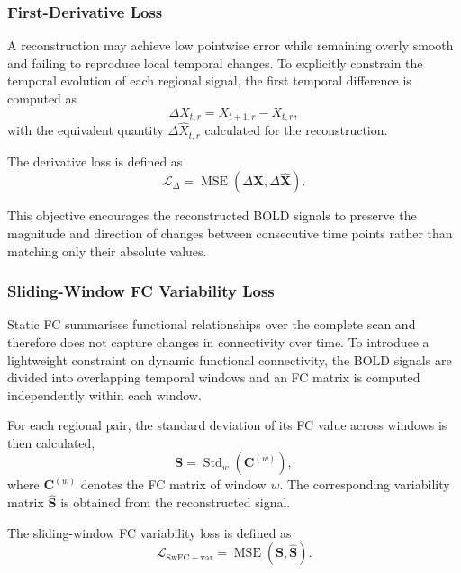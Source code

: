 \subsubsection{First-Derivative Loss}

A reconstruction may achieve low pointwise error while remaining overly
smooth and failing to reproduce local temporal changes. To explicitly
constrain the temporal evolution of each regional signal, the first
temporal difference is computed as
\begin{equation}
    \Delta X_{t,r}
    =
    X_{t+1,r}-X_{t,r},
\end{equation}
with the equivalent quantity $\Delta\hat{X}_{t,r}$ calculated for the
reconstruction.

The derivative loss is defined as
\begin{equation}
    \mathcal{L}_{\Delta}
    =
    \operatorname{MSE}
    \left(
        \Delta\mathbf{X},
        \Delta\hat{\mathbf{X}}
    \right).
\end{equation}

This objective encourages the reconstructed BOLD signals to preserve the
magnitude and direction of changes between consecutive time points rather
than matching only their absolute values.

\subsubsection{Sliding-Window FC Variability Loss}

Static FC summarises functional relationships over the complete scan and
therefore does not capture changes in connectivity over time. To introduce
a lightweight constraint on dynamic functional connectivity, the BOLD
signals are divided into overlapping temporal windows and an FC matrix is
computed independently within each window.

For each regional pair, the standard deviation of its FC value across
windows is then calculated,
\begin{equation}
    \mathbf{S}
    =
    \operatorname{Std}_{w}
    \left(
        \mathbf{C}^{(w)}
    \right),
\end{equation}
where $\mathbf{C}^{(w)}$ denotes the FC matrix of window $w$. The
corresponding variability matrix $\hat{\mathbf{S}}$ is obtained from the
reconstructed signal.

The sliding-window FC variability loss is defined as
\begin{equation}
    \mathcal{L}_{\mathrm{SwFC-var}}
    =
    \operatorname{MSE}
    \left(
        \mathbf{S},
        \hat{\mathbf{S}}
    \right).
\end{equation}

